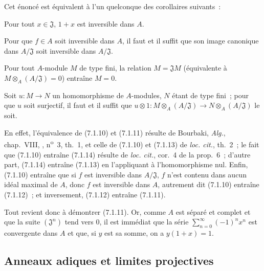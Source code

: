 Cet énoncé est équivalent à l'un quelconque des corollaires suivants~:

\begin{corollary}[7.1.11]
\label{0.7.1.11-fr}
Pour tout $x\in\mathfrak J$, $1+x$ est inversible dans $A$.
\end{corollary}

\begin{corollary}[7.1.12]
\label{0.7.1.12-fr}
Pour que $f\in A$ soit inversible dans $A$, il faut et il suffit que son image
canonique dans $A/\mathfrak J$ soit inversible dans $A/\mathfrak J$.
\end{corollary}

\begin{corollary}[7.1.13]
\label{0.7.1.13-fr}
Pour tout $A$-module $M$ de type fini, la relation $M=\mathfrak JM$
(équivalente à $M\otimes_A(A/\mathfrak J)=0$) entraîne $M=0$.
\end{corollary}

\begin{corollary}[7.1.14]
\label{0.7.1.14-fr}
Soit $u:M\to N$ un homomorphisme de $A$-modules, $N$ étant de type fini~;
pour que $u$ soit surjectif, il faut et il suffit que
$u\otimes1:M\otimes_A(A/\mathfrak J)\to N\otimes_A(A/\mathfrak J)$ le soit.
\end{corollary}

En effet, l'équivalence de (7.1.10) et (7.1.11) résulte de Bourbaki,
\emph{Alg.}, chap.~VIII, , n\textsuperscript{o}~3, th.~1, et
celle de (7.1.10) et (7.1.13) de \emph{loc. cit.}, th.~2~; le fait que
(7.1.10) entraîne (7.1.14) résulte de \emph{loc. cit.}, cor.~4 de la prop.~6~;
d'autre part, (7.1.14) entraîne (7.1.13) en l'appliquant à l'homomorphisme nul.
Enfin, (7.1.10) entraîne que si $f$ est inversible dans $A/\mathfrak J$, $f$
n'est contenu dans aucun idéal maximal de $A$, donc $f$ est inversible dans
$A$, autrement dit (7.1.10) entraîne (7.1.12)~; et inversement, (7.1.12)
entraîne (7.1.11).

Tout revient donc à démontrer (7.1.11). Or, comme $A$ est séparé et complet et
que la suite $(\mathfrak J^n)$ tend vers $0$, il est immédiat que la série
$\sum_{n=0}^{\infty}(-1)^n x^n$ est convergente dans $A$ et que, si $y$ est
sa somme, on a $y(1+x)=1$.

\subsection{Anneaux adiques et limites projectives}
\label{subsection:0.7.2-fr}

